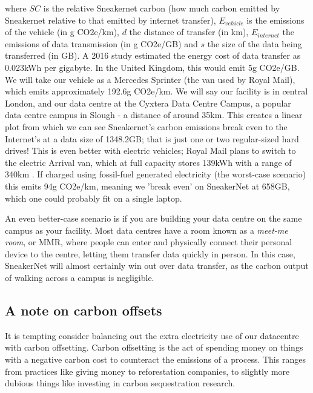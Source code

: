 \documentclass{article}
\begin{document}
where $SC$ is the relative Sneakernet carbon (how much carbon emitted by Sneakernet relative to that emitted by internet transfer), $E_{vehicle}$ is the emissions of the vehicle (in g CO2e/km), $d$ the distance of transfer (in km), $E_{internet}$ the emissions of data transmission (in g CO2e/GB) and $s$ the size of the data being transferred (in GB). A 2016 study estimated the energy cost of data transfer as 0.023kWh per gigabyte. \citep{aslan2018electricity} In the United Kingdom, this would emit 5g CO2e/GB. We will take our vehicle as a Mercedes Sprinter (the van used by Royal Mail), which emits approximately 192.6g CO2e/km. \citep{mercedes2019sprinter} We will say our facility is in central London, and our data centre at the Cyxtera Data Centre Campus, a popular data centre campus in Slough - a distance of around 35km. This creates a linear plot from which we can see Sneakernet's carbon emissions break even to the Internet's at a data size of 1348.2GB; that is just one or two regular-sized hard drives! This is even better with electric vehicles; Royal Mail plans to switch to the electric Arrival van, which at full capacity stores 139kWh with a range of 340km \citep{hubbard2021new}. If charged using fossil-fuel generated electricity (the worst-case scenario) this emits 94g CO2e/km, meaning we 'break even' on SneakerNet at 658GB, which one could probably fit on a single laptop. \newline

An even better-case scenario is if you are building your data centre on the same campus as your facility. Most data centres have a room known as a \emph{meet-me room}, or MMR, where people can enter and physically connect their personal device to the centre, letting them transfer data quickly in person. In this case, SneakerNet will almost certainly win out over data transfer, as the carbon output of walking across a campus is negligible. \newline


\subsection{A note on carbon offsets}
It is tempting consider balancing out the extra electricity use of our datacentre with carbon offsetting. Carbon offsetting is the act of spending money on things with a negative carbon cost to counteract the emissions of a process. This ranges from practices like giving money to reforestation companies, to slightly more dubious things like investing in carbon sequestration research. \newline
\end{document}
